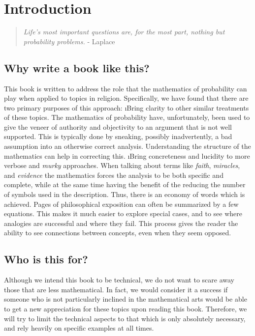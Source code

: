\chapter{Introduction}\label{ch:intro}

\begin{quote}
{\em Life's most important questions are, for the most part, nothing but probability problems.} - Laplace
\end{quote}

\section{Why write a book like this?}

This book is written to address the role that the mathematics of probability can play when applied to topics in religion.  Specifically, we have found that there are two primary purposes of this approach:
\be
\i Bring clarity to other similar treatments of these topics.  The mathematics of probability have, unfortunately, been used to give the veneer of authority and objectivity to an argument that is not well supported\cite{swinburne2003resurrection}.  This is typically done by sneaking, possibly inadvertently, a bad assumption into an otherwise correct analysis.  Understanding the structure of the mathematics can help in correcting this.
\i Bring concreteness and lucidity to more verbose and {\em murky} approaches.  When talking about terms like {\em faith}, {\em miracles}, and {\em evidence} the mathematics forces the analysis to be both specific and complete, while at the same time having the benefit of the reducing the number of symbols used in the description.  Thus, there is an economy of words which is achieved.  Pages of philosophical exposition can often be summarized by a few equations\cite{howard2013propositional}.  This makes it much easier to explore special cases, and to see where analogies are successful and where they fail.  This process gives the reader the ability to see connections between concepts, even when they seem opposed.
\ee

\section{Who is this for?}

Although we intend this book to be technical, we do not want to scare away those that are less mathematical.  In fact, we would consider it a success if someone who is not particularly inclined in the mathematical arts would be able to get a new appreciation for these topics upon reading this book.  Therefore, we will try to limit the technical aspects to that which is only absolutely necessary, and rely heavily on specific examples at all times.

